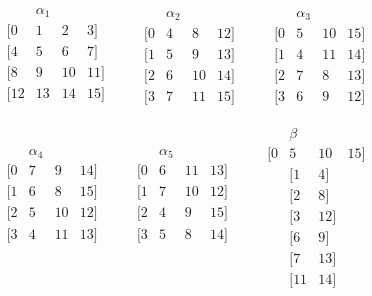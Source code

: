 \documentclass{amsart}
\theoremstyle{plain}
\theoremstyle{definition}
\theoremstyle{definition}
\numberwithin{equation}{section}
\newcommand{\<}{\ensuremath{\langle}}
\renewcommand{\>}{\ensuremath{\rangle}}
\begin{document}
\[
\begin{matrix}
& \alpha_1 &&\\
  [0 & 1 & 2 & 3]\\
  [4 & 5 & 6 & 7]\\
  [8 & 9 & 10 & 11]\\
  [12 & 13 & 14 & 15]\\
\end{matrix}
\qquad
\begin{matrix}
& \alpha_2 &&\\
  [0 &   4 &   8 & 12]\\
  [1 &   5 &   9 & 13]\\
  [2 &   6 & 10 & 14]\\
  [3 &   7 & 11 & 15]
\end{matrix}
\qquad
\begin{matrix}
& \alpha_3 &&\\
  [0 &   5 &  10 & 15]\\
  [1 &   4 &  11 & 14]\\
  [2 &   7 & 8 & 13]\\
  [3 &   6 & 9 & 12]
\end{matrix}
\]

\vskip5mm

\[
\begin{matrix}
& \alpha_4 &&\\
  [0 &   7 & 9 & 14]\\
  [1 &   6 & 8 & 15]\\
  [2 &   5 & 10 & 12]\\
  [3 &   4 & 11 & 13]\\
&&&\\
&&&\\
&&&\\
\end{matrix}
\qquad
\begin{matrix}
& \alpha_5 &&\\
  [0 &   6 & 11 & 13]\\
  [1 &   7 & 10 & 12]\\
  [2 &   4 & 9 & 15]\\
  [3 &   5 & 8 & 14]\\
&&&\\
&&&\\
&&&\\
\end{matrix}
\qquad
\begin{matrix}
& \beta &&\\
  [0 &   5 &  10 & 15]\\
&  [1 &   4] & \\
&  [2 & 8] &\\
&  [3 &   12] & \\
& [6 & 9] & \\
&  [7 & 13] &\\
& [11 & 14] & 
\end{matrix}
\]
\end{document}
